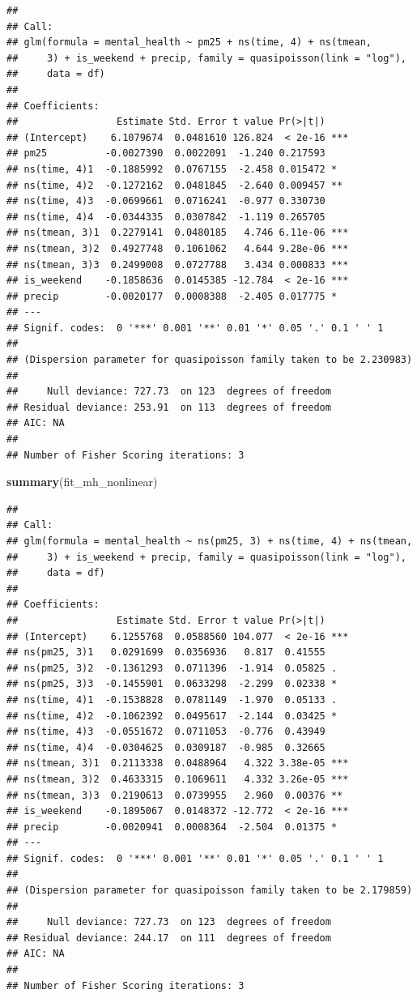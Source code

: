 \documentclass[
]{article}
\newenvironment{Shaded}{\begin{snugshade}}{\end{snugshade}}
\newcommand{\FunctionTok}[1]{\textcolor[rgb]{0.13,0.29,0.53}{\textbf{#1}}}
\newcommand{\NormalTok}[1]{#1}
\begin{document}
\begin{verbatim}
## 
## Call:
## glm(formula = mental_health ~ pm25 + ns(time, 4) + ns(tmean, 
##     3) + is_weekend + precip, family = quasipoisson(link = "log"), 
##     data = df)
## 
## Coefficients:
##                 Estimate Std. Error t value Pr(>|t|)    
## (Intercept)    6.1079674  0.0481610 126.824  < 2e-16 ***
## pm25          -0.0027390  0.0022091  -1.240 0.217593    
## ns(time, 4)1  -0.1885992  0.0767155  -2.458 0.015472 *  
## ns(time, 4)2  -0.1272162  0.0481845  -2.640 0.009457 ** 
## ns(time, 4)3  -0.0699661  0.0716241  -0.977 0.330730    
## ns(time, 4)4  -0.0344335  0.0307842  -1.119 0.265705    
## ns(tmean, 3)1  0.2279141  0.0480185   4.746 6.11e-06 ***
## ns(tmean, 3)2  0.4927748  0.1061062   4.644 9.28e-06 ***
## ns(tmean, 3)3  0.2499008  0.0727788   3.434 0.000833 ***
## is_weekend    -0.1858636  0.0145385 -12.784  < 2e-16 ***
## precip        -0.0020177  0.0008388  -2.405 0.017775 *  
## ---
## Signif. codes:  0 '***' 0.001 '**' 0.01 '*' 0.05 '.' 0.1 ' ' 1
## 
## (Dispersion parameter for quasipoisson family taken to be 2.230983)
## 
##     Null deviance: 727.73  on 123  degrees of freedom
## Residual deviance: 253.91  on 113  degrees of freedom
## AIC: NA
## 
## Number of Fisher Scoring iterations: 3
\end{verbatim}

\begin{Shaded}
\begin{Highlighting}[]
\FunctionTok{summary}\NormalTok{(fit\_mh\_nonlinear)}
\end{Highlighting}
\end{Shaded}

\begin{verbatim}
## 
## Call:
## glm(formula = mental_health ~ ns(pm25, 3) + ns(time, 4) + ns(tmean, 
##     3) + is_weekend + precip, family = quasipoisson(link = "log"), 
##     data = df)
## 
## Coefficients:
##                 Estimate Std. Error t value Pr(>|t|)    
## (Intercept)    6.1255768  0.0588560 104.077  < 2e-16 ***
## ns(pm25, 3)1   0.0291699  0.0356936   0.817  0.41555    
## ns(pm25, 3)2  -0.1361293  0.0711396  -1.914  0.05825 .  
## ns(pm25, 3)3  -0.1455901  0.0633298  -2.299  0.02338 *  
## ns(time, 4)1  -0.1538828  0.0781149  -1.970  0.05133 .  
## ns(time, 4)2  -0.1062392  0.0495617  -2.144  0.03425 *  
## ns(time, 4)3  -0.0551672  0.0711053  -0.776  0.43949    
## ns(time, 4)4  -0.0304625  0.0309187  -0.985  0.32665    
## ns(tmean, 3)1  0.2113338  0.0488964   4.322 3.38e-05 ***
## ns(tmean, 3)2  0.4633315  0.1069611   4.332 3.26e-05 ***
## ns(tmean, 3)3  0.2190613  0.0739955   2.960  0.00376 ** 
## is_weekend    -0.1895067  0.0148372 -12.772  < 2e-16 ***
## precip        -0.0020941  0.0008364  -2.504  0.01375 *  
## ---
## Signif. codes:  0 '***' 0.001 '**' 0.01 '*' 0.05 '.' 0.1 ' ' 1
## 
## (Dispersion parameter for quasipoisson family taken to be 2.179859)
## 
##     Null deviance: 727.73  on 123  degrees of freedom
## Residual deviance: 244.17  on 111  degrees of freedom
## AIC: NA
## 
## Number of Fisher Scoring iterations: 3
\end{verbatim}
\end{document}
